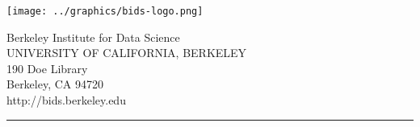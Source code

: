 \documentclass[letterpaper]{minimal}
\begin{document}
\begin{minipage}{\textwidth}
    \begin{minipage}{0.4\textwidth}
      \texttt{[image: ../graphics/bids-logo.png]}
    \end{minipage}
    \hfill
    \begin{minipage}{0.6\textwidth}\raggedleft
      \vspace{0.5in}
      \textcolor{bidsblue}{
        \noindent Berkeley Institute for Data Science\\
        \textsc{UNIVERSITY OF CALIFORNIA, BERKELEY}\\
        190 Doe Library\\
        Berkeley, CA 94720\\
        http://bids.berkeley.edu}%
    \end{minipage}
    \begin{minipage}{\textwidth}
      \vspace{7.5mm}
      \hspace{2mm}\rule{\textwidth}{0.4pt}
    \end{minipage}
\end{minipage}
\end{document}
